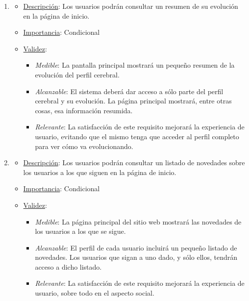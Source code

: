 \begin{enumerate}
\item %
  \begin{itemize}
  \item \underline{Descripción}: Los usuarios podrán consultar un resumen de su evolución en la página de inicio.
  \item \underline{Importancia}: Condicional
  \item \underline{Validez}:
    \begin{itemize}
    \item \textit{Medible}: La pantalla principal mostrará un pequeño resumen de la evolución del perfil cerebral.
    \item \textit{Alcanzable}: El sistema deberá dar acceso a sólo parte del perfil cerebral y su evolución. La página principal mostrará, entre otras cosas, esa información resumida.
    \item \textit{Relevante}: La satisfacción de este requisito mejorará la experiencia de usuario, evitando que el mismo tenga que acceder al perfil completo para ver cómo va evolucionando.
    \end{itemize}
  \end{itemize}

\item %
  \begin{itemize}
  \item \underline{Descripción}: Los usuarios podrán consultar un listado de novedades sobre los usuarios a los que siguen en la página de inicio.
  \item \underline{Importancia}: Condicional
  \item \underline{Validez}:
    \begin{itemize}
    \item \textit{Medible}: La página principal del sitio web mostrará las novedades de los usuarios a los que se sigue.
    \item \textit{Alcanzable}: El perfil de cada usuario incluirá un pequeño listado de novedades. Los usuarios que sigan a uno dado, y sólo ellos, tendrán acceso a dicho listado.
    \item \textit{Relevante}: La satisfacción de este requisito mejorará la experiencia de usuario, sobre todo en el aspecto social.
    \end{itemize}
  \end{itemize}


\end{enumerate}
